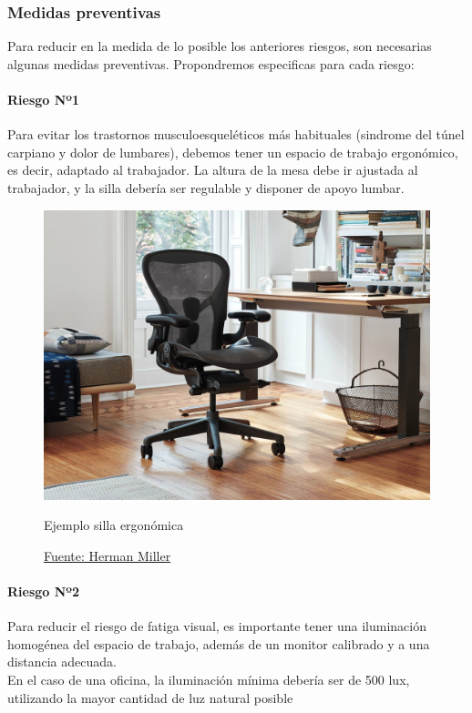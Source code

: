 \subsubsection{Medidas preventivas}
Para reducir en la medida de lo posible los anteriores riesgos, son necesarias algunas medidas preventivas.
Propondremos especificas para cada riesgo:\\
\paragraph*{Riesgo Nº1}
Para evitar los trastornos musculoesqueléticos más habituales (sindrome del túnel carpiano y dolor de lumbares), debemos
tener un espacio de trabajo ergonómico, es decir, adaptado al trabajador. La altura de la mesa debe ir ajustada al trabajador, y la
silla debería ser regulable y disponer de apoyo lumbar.
\begin{figure}[H]
    \centering
    \includegraphics[width=1.0\textwidth]{Fol/silla.jpg}
    \caption{Ejemplo silla ergonómica}
    \caption*{\href{https://www.hermanmiller.com/es_mx/products/seating/office-chairs/aeron-chairs/}{Fuente: Herman Miller}}
\end{figure}
\paragraph*{Riesgo Nº2}
Para reducir el riesgo de fatiga visual, es importante tener una iluminación
homogénea del espacio de trabajo, además de un monitor calibrado y a una distancia
adecuada.\\
En el caso de una oficina, la iluminación mínima debería ser de 500 lux, utilizando la mayor cantidad de luz natural posible
